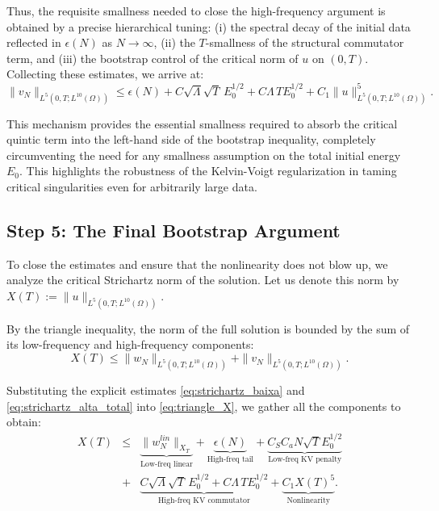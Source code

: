 \documentclass[11pt,letterpaper]{amsart}
\begin{document}
Thus, the requisite smallness needed to close the high-frequency argument is obtained by a precise hierarchical tuning: (i) the spectral decay of the initial data reflected in $\epsilon(N)$ as $N \to \infty$, (ii) the $T$-smallness of the structural commutator term, and (iii) the bootstrap control of the critical norm of $u$ on $(0,T)$. Collecting these estimates, we arrive at:
\begin{equation}\label{eq:strichartz_alta_total}
    \|v_N\|_{L^5(0,T; L^{10}(\Omega))} \le \epsilon(N) + C\sqrt{\Lambda} \sqrt{T}\,E_0^{1/2} + C\Lambda\,T E_0^{1/2} + C_1 \|u\|_{L^5(0,T;L^{10}(\Omega))}^5.
\end{equation}

This mechanism provides the essential smallness required to absorb the critical quintic term into the left-hand side of the bootstrap inequality, completely circumventing the need for any smallness assumption on the total initial energy $E_0$. This highlights the robustness of the Kelvin-Voigt regularization in taming critical singularities even for arbitrarily large data.


\subsection{Step 5: The Final Bootstrap Argument}\label{sec:well-posedness}

To close the estimates and ensure that the nonlinearity does not blow up, we analyze the critical Strichartz norm of the solution. Let us denote this norm by $X(T) := \|u\|_{L^5(0,T; L^{10}(\Omega))}$.

By the triangle inequality, the norm of the full solution is bounded by the sum of its low-frequency and high-frequency components:
\begin{equation}\label{eq:triangle_X}
    X(T) \le \|w_N\|_{L^5(0,T; L^{10}(\Omega))} + \|v_N\|_{L^5(0,T; L^{10}(\Omega))}.
\end{equation}

Substituting the explicit estimates \eqref{eq:strichartz_baixa} and \eqref{eq:strichartz_alta_total} into \eqref{eq:triangle_X}, we gather all the components to obtain:
\begin{eqnarray}\label{eq:bootstrap_raw}
    X(T) &\le& \underbrace{\|w_N^{lin}\|_{X_T}}_{\text{Low-freq linear}} + \underbrace{\epsilon(N)}_{\text{High-freq tail}} + \underbrace{C_S C_a N \sqrt{T} E_0^{1/2}}_{\text{Low-freq KV penalty}}\\ 
    &+& \underbrace{C\sqrt{\Lambda} \sqrt{T}\,E_0^{1/2} + C\Lambda\,T E_0^{1/2}}_{\text{High-freq KV commutator}} + \underbrace{C_1 X(T)^5}_{\text{Nonlinearity}}.\nonumber
\end{eqnarray}
\end{document}
